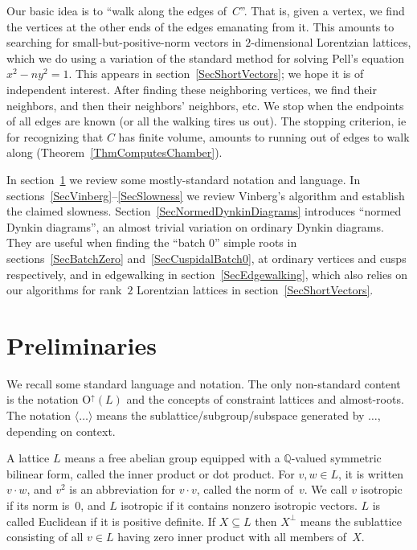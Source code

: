 \documentclass[12pt]{amsart}
\def\gend#1{\langle#1\rangle}
\def\O{\mathrm{O}}
\def\Oup{\O^{\uparrow}}
\def\Q{\mathbb{Q}}
\def\sset{\subseteq}
\numberwithin{theorem}{section}
\numberwithin{equation}{section}
\numberwithin{figure}{section}
\theoremstyle{remark}
\begin{document}
Our basic idea is to ``walk along the edges of~$C$''.  That is,
given a vertex, 
we 
find the vertices at the other ends of the edges emanating from it.
This amounts to searching for small-but-positive-norm vectors
in $2$-dimensional Lorentzian lattices, which we do using
a variation of the standard method for solving Pell's equation 
$x^2-ny^2=1$.  This appears in
section~\ref{SecShortVectors}; we hope it is of independent interest.
After finding these neighboring 
vertices, we find their neighbors, and then their neighbors' neighbors, etc.
We stop when the endpoints of all edges are known
(or all the walking tires us out).  
The stopping
criterion, ie 
for recognizing that $C$ has finite volume, amounts to
running out of edges to walk along (Theorem~\ref{ThmComputesChamber}).  

In section~\ref{SecPreliminaries} we review some mostly-standard notation
and language. In sections~\ref{SecVinberg}--\ref{SecSlowness} we review Vinberg's
algorithm and establish the claimed slowness.
Section~\ref{SecNormedDynkinDiagrams} introduces ``normed Dynkin diagrams'', an
almost trivial variation on ordinary Dynkin diagrams.  They are
useful when finding the ``batch 0'' simple 
roots in sections~\ref{SecBatchZero} and~\ref{SecCuspidalBatch0}, at ordinary vertices
and cusps respectively, and  in edgewalking
in section~\ref{SecEdgewalking}, which also relies on our algorithms
for rank~$2$ Lorentzian lattices in section~\ref{SecShortVectors}.

\section{Preliminaries}
\label{SecPreliminaries}

\noindent
We recall some standard language and notation.  The only 
non-standard content is the notation $\Oup(L)$ and
the concepts of constraint lattices
and almost-roots.  The notation $\gend{\dots}$
means the sub\-lattice/sub\-group/\discretionary{}{}{}sub\-space generated by $\dots$,
depending on context.

A lattice $L$ means a free abelian group equipped with a
$\Q$-valued symmetric bilinear form, called the inner product
or dot product.
For $v,w\in L$, it is written $v\cdot w$, and $v^2$ is an 
abbreviation for $v\cdot v$, called the norm of~$v$.
We call $v$ isotropic if its norm is~$0$, and $L$
isotropic if it contains nonzero isotropic vectors.
$L$ is called Euclidean if it is positive definite.
If $X\sset L$ then $X^\perp$ means the
sublattice consisting of all $v\in L$ having zero inner product
with all members of~$X$.  
\end{document}
